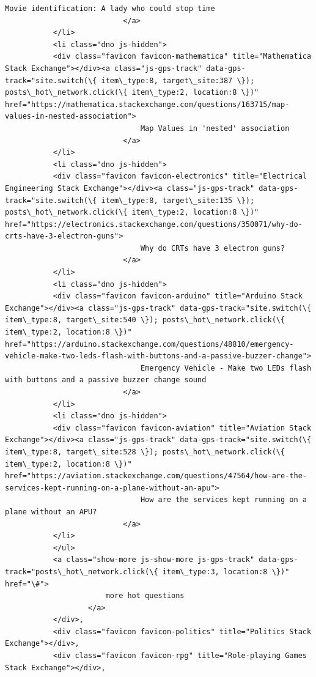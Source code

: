 \documentclass[11pt]{article}
\begin{document}
\begin{Verbatim}[commandchars=\\\{\}]
                               Movie identification: A lady who could stop time
                           </a>
           </li>
           <li class="dno js-hidden">
           <div class="favicon favicon-mathematica" title="Mathematica Stack Exchange"></div><a class="js-gps-track" data-gps-track="site.switch(\{ item\_type:8, target\_site:387 \}); posts\_hot\_network.click(\{ item\_type:2, location:8 \})" href="https://mathematica.stackexchange.com/questions/163715/map-values-in-nested-association">
                               Map Values in 'nested' association
                           </a>
           </li>
           <li class="dno js-hidden">
           <div class="favicon favicon-electronics" title="Electrical Engineering Stack Exchange"></div><a class="js-gps-track" data-gps-track="site.switch(\{ item\_type:8, target\_site:135 \}); posts\_hot\_network.click(\{ item\_type:2, location:8 \})" href="https://electronics.stackexchange.com/questions/350071/why-do-crts-have-3-electron-guns">
                               Why do CRTs have 3 electron guns?
                           </a>
           </li>
           <li class="dno js-hidden">
           <div class="favicon favicon-arduino" title="Arduino Stack Exchange"></div><a class="js-gps-track" data-gps-track="site.switch(\{ item\_type:8, target\_site:540 \}); posts\_hot\_network.click(\{ item\_type:2, location:8 \})" href="https://arduino.stackexchange.com/questions/48810/emergency-vehicle-make-two-leds-flash-with-buttons-and-a-passive-buzzer-change">
                               Emergency Vehicle - Make two LEDs flash with buttons and a passive buzzer change sound
                           </a>
           </li>
           <li class="dno js-hidden">
           <div class="favicon favicon-aviation" title="Aviation Stack Exchange"></div><a class="js-gps-track" data-gps-track="site.switch(\{ item\_type:8, target\_site:528 \}); posts\_hot\_network.click(\{ item\_type:2, location:8 \})" href="https://aviation.stackexchange.com/questions/47564/how-are-the-services-kept-running-on-a-plane-without-an-apu">
                               How are the services kept running on a plane without an APU?
                           </a>
           </li>
           </ul>
           <a class="show-more js-show-more js-gps-track" data-gps-track="posts\_hot\_network.click(\{ item\_type:3, location:8 \})" href="\#">
                       more hot questions
                   </a>
           </div>,
           <div class="favicon favicon-politics" title="Politics Stack Exchange"></div>,
           <div class="favicon favicon-rpg" title="Role-playing Games Stack Exchange"></div>,

\end{Verbatim}
\end{document}
